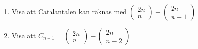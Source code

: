 \documentclass{tufte-handout}
\begin{document}
\begin{xca}
  \hspace{1cm}\par
  \begin{enumerate}[label=(\alph*)]
    \item Visa att Catalantalen kan räknas med $\begin{pmatrix}2n\\n\end{pmatrix}-\begin{pmatrix}2n\\n-1\end{pmatrix}$
    \item Visa att $C_{n+1} = \begin{pmatrix}2n\\n\end{pmatrix}-\begin{pmatrix}2n\\n-2\end{pmatrix}$
  \end{enumerate}
\end{xca}

\newpage
\end{document}
